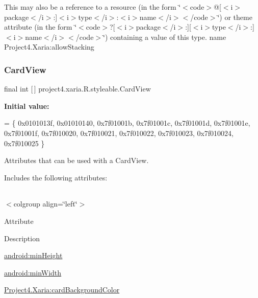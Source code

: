 This may also be a reference to a resource (in the form \char`\"{}$<$code$>$@\mbox{[}$<$i$>$package$<$/i$>$\+:\mbox{]}$<$i$>$type$<$/i$>$\+:$<$i$>$name$<$/i$>$$<$/code$>$\char`\"{}) or theme attribute (in the form \char`\"{}$<$code$>$?\mbox{[}$<$i$>$package$<$/i$>$\+:\mbox{]}\mbox{[}$<$i$>$type$<$/i$>$\+:\mbox{]}$<$i$>$name$<$/i$>$$<$/code$>$\char`\"{}) containing a value of this type.  name Project4.\+Xaria\+:allow\+Stacking \mbox{\label{classproject4_1_1xaria_1_1R_1_1styleable_abef2e3d3e2b11dd786470094dbc57ea4}} 
\subsubsection{\texorpdfstring{Card\+View}{CardView}}
{\footnotesize\ttfamily final int \mbox{[}$\,$\mbox{]} project4.\+xaria.\+R.\+styleable.\+Card\+View\hspace{0.3cm}{\ttfamily [static]}}

{\bfseries Initial value\+:}
\begin{DoxyCode}
= \{
            0x0101013f, 0x01010140, 0x7f01001b, 0x7f01001c,
            0x7f01001d, 0x7f01001e, 0x7f01001f, 0x7f010020,
            0x7f010021, 0x7f010022, 0x7f010023, 0x7f010024,
            0x7f010025
        \}
\end{DoxyCode}
Attributes that can be used with a Card\+View. 

Includes the following attributes\+:

\tabulinesep=1mm
\begin{longtabu} spread 0pt [c]{*{0}{|X[-1]}|}
\hline
\end{longtabu}
$<$colgroup align=\char`\"{}left\char`\"{}$>$ 

Attribute

Description 

{\ttfamily \hyperlink{classproject4_1_1xaria_1_1R_1_1styleable_a2713d27646c85746d8ab8bd6ccc6c04f}{android\+:min\+Height}}

{\ttfamily \hyperlink{classproject4_1_1xaria_1_1R_1_1styleable_a656ba8dea65186ef0004bd7170c8fa84}{android\+:min\+Width}}

{\ttfamily \hyperlink{classproject4_1_1xaria_1_1R_1_1styleable_ab56702194685aec3a36f901e12d1f432}{Project4.\+Xaria\+:card\+Background\+Color}}

